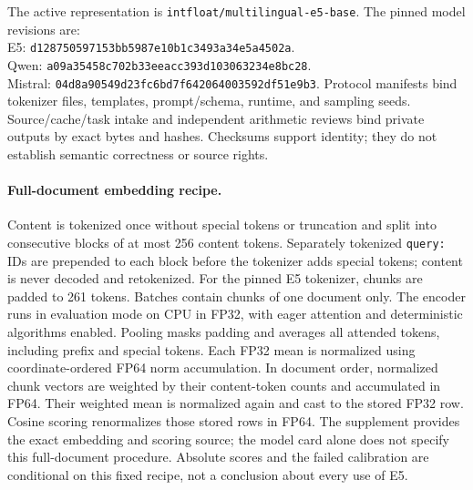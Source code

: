 The active representation is \texttt{intfloat/multilingual-e5-base}.
The pinned model revisions are:\\
E5: \texttt{d128750597153bb5987e10b1c3493a34e5a4502a}.\\
Qwen: \texttt{a09a35458c702b33eeacc393d103063234e8bc28}.\\
Mistral: \texttt{04d8a90549d23fc6bd7f642064003592df51e9b3}.
Protocol manifests
bind tokenizer files, templates, prompt/schema, runtime, and sampling
seeds. Source/cache/task intake and independent arithmetic reviews bind
private outputs by exact bytes and hashes. Checksums support identity;
they do not establish semantic correctness or source rights.

\paragraph{Full-document embedding recipe.}\label{app:embedding}
Content is tokenized once without special tokens or truncation and split
into consecutive blocks of at most 256 content tokens. Separately tokenized
\texttt{query: } IDs are prepended to each block before the tokenizer adds
special tokens; content is never decoded and retokenized. For the pinned
E5 tokenizer, chunks are padded to 261 tokens. Batches contain chunks of
one document only. The encoder runs in evaluation mode on CPU in FP32,
with eager attention and deterministic algorithms enabled. Pooling masks
padding and averages all attended tokens, including prefix and special
tokens. Each FP32 mean is normalized using coordinate-ordered FP64 norm
accumulation. In document order, normalized chunk vectors are weighted by
their content-token counts and accumulated in FP64. Their weighted mean
is normalized again and cast to the stored FP32 row. Cosine scoring
renormalizes those stored rows in FP64. The supplement provides the exact
embedding and scoring source; the model card alone does not specify this
full-document procedure. Absolute scores and the failed calibration are
conditional on this fixed recipe, not a conclusion about every use of E5.

